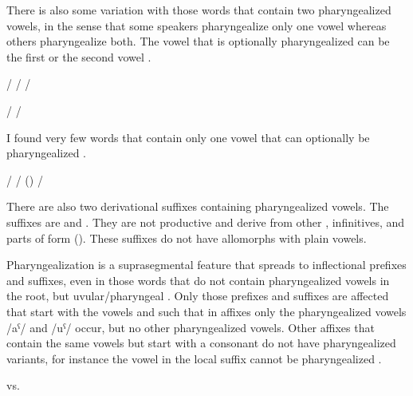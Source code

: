 There is also some variation with those words that contain two pharyngealized vowels, in the sense that some speakers pharyngealize only one vowel whereas others pharyngealize both. The vowel that is optionally pharyngealized can be the first  or the second vowel .
%
\begin{exe}
	\label{ex:pharyngealization of first vowel or both vowels}
	\begin{xlist}
		\ex	{}\slash{} 
		\ex	{}\slash{} 
		\ex	{}\slash{} 
	\end{xlist}

	\label{ex:pharyngealization of second vowel or both vowels}
	\begin{xlist}
		\ex	{}\slash{} \sqt{secret, secretly}
		\ex	{}\slash{} \sqt{boy, son}
	\end{xlist}
\end{exe}

I found very few words that contain only one vowel that can optionally be pharyngealized .
%
\begin{exe}
	\ex	\label{ex:optional pharyngealization vowels phon}
	\begin{xlist}
		\ex	{}\slash{} \sqt{snow}
		\ex	{}\slash{}  (\isi{ideophone})
		\ex	{}\slash{} \sqt{wine}
	\end{xlist}
\end{exe}

There are also two derivational suffixes containing pharyngealized vowels. The suffixes are  and . They are not productive and derive   from other , infinitives, and parts of  form (). These suffixes do not have allomorphs with plain vowels.

Pharyngealization is a suprasegmental feature that spreads to inflectional prefixes and suffixes, even in those words that do not contain pharyngealized vowels in the root, but uvular/pharyngeal . Only those prefixes and suffixes are affected that start with the vowels  and  such that in affixes only the pharyngealized vowels /aˁ/ and /uˁ/ occur, but no other pharyngealized vowels. Other affixes that contain the same vowels but start with a consonant do not have pharyngealized variants, for instance the vowel in the local  suffix  cannot be pharyngealized . 
%
\begin{exe}
	\ex	\label{ex:pharyngealization na phon}
\TabPositions{12em}
	  \tab vs.  
\end{exe}

